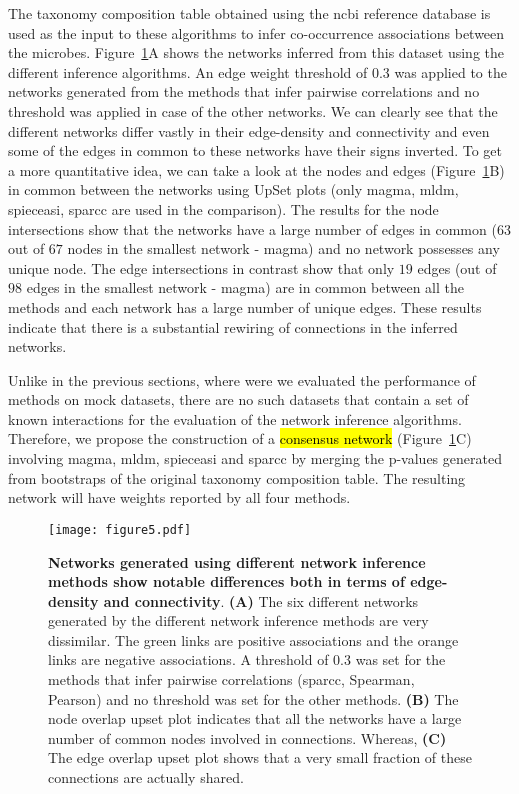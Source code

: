   The taxonomy composition table obtained using the \ac{ncbi} reference database is used as the input to these algorithms to infer co-occurrence associations between the microbes.
  Figure~\ref{fig:figure5}A shows the networks inferred from this dataset using the different inference algorithms.
  An edge weight threshold of 0.3 was applied to the networks generated from the methods that infer pairwise correlations and no threshold was applied in case of the other networks.
  We can clearly see that the different networks differ vastly in their edge-density and connectivity and even some of the edges in common to these networks have their signs inverted.
  To get a more quantitative idea, we can take a look at the nodes and edges (Figure~\ref{fig:figure5}B) in common between the networks using UpSet plots (only \ac{magma}, \ac{mldm}, \ac{spieceasi}, \ac{sparcc} are used in the comparison).
  The results for the node intersections show that the networks have a large number of edges in common ($63$ out of $67$ nodes in the smallest network - \ac{magma}) and no network possesses any unique node.
  The edge intersections in contrast show that only $19$ edges (out of $98$ edges in the smallest network - \ac{magma}) are in common between all the methods and each network has a large number of unique edges.
  These results indicate that there is a substantial rewiring of connections in the inferred networks.

  Unlike in the previous sections, where were we evaluated the performance of methods on mock datasets, there are no such datasets that contain a set of known interactions for the evaluation of the network inference algorithms.
  Therefore, we propose the construction of a \hl{consensus network} (Figure~\ref{fig:figure5}C) involving \ac{magma}, \ac{mldm}, \ac{spieceasi} and \ac{sparcc} by merging the p-values generated from bootstraps of the original taxonomy composition table.
  The resulting network will have weights reported by all four methods.

  \begin{figure}[h]
    \centering
    \texttt{[image: figure5.pdf]}
    \caption{
      \textbf{Networks generated using different network inference methods show notable differences both in terms of edge-density and connectivity}.
      \textbf{(A)} The six different networks generated by the different network inference methods are very dissimilar.
      The green links are positive associations and the orange links are negative associations.
      A threshold of 0.3 was set for the methods that infer pairwise correlations (\ac{sparcc}, Spearman, Pearson) and no threshold was set for the other methods.
      \textbf{(B)} The node overlap upset plot indicates that all the networks have a large number of common nodes involved in connections.
      Whereas, \textbf{(C)} The edge overlap upset plot shows that a very small fraction of these connections are actually shared.
    }
    \label{fig:figure5}
  \end{figure}

